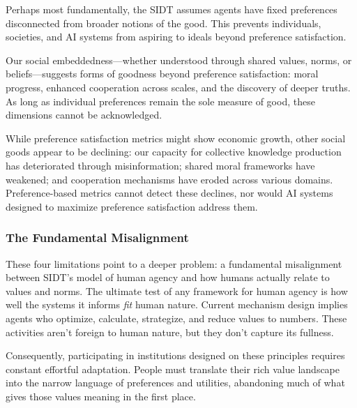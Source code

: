 Perhaps most fundamentally, the SIDT assumes agents have fixed preferences disconnected from broader notions of the good. This prevents individuals, societies, and AI systems from aspiring to ideals beyond preference satisfaction.

Our social embeddedness—whether understood through shared values, norms, or beliefs—suggests forms of goodness beyond preference satisfaction: moral progress, enhanced cooperation across scales, and the discovery of deeper truths\footnotemark{}. As long as individual preferences remain the sole measure of good, these dimensions cannot be acknowledged.


While preference satisfaction metrics might show economic growth, other social goods appear to be declining: our capacity for collective knowledge production has deteriorated through misinformation; shared moral frameworks have weakened; and cooperation mechanisms have eroded across various domains. Preference-based metrics cannot detect these declines, nor would AI systems designed to maximize preference satisfaction address them.

\subsubsection{The Fundamental Misalignment}

These four limitations point to a deeper problem: a fundamental misalignment between SIDT's model of human agency and how humans actually relate to values and norms. The ultimate test of any framework for human agency is how well the systems it informs \textit{fit} human nature. Current mechanism design implies agents who optimize, calculate, strategize, and reduce values to numbers. These activities aren't foreign to human nature, but they don't capture its fullness.

Consequently, participating in institutions designed on these principles requires constant effortful adaptation. People must translate their rich value landscape into the narrow language of preferences and utilities, abandoning much of what gives those values meaning in the first place.


